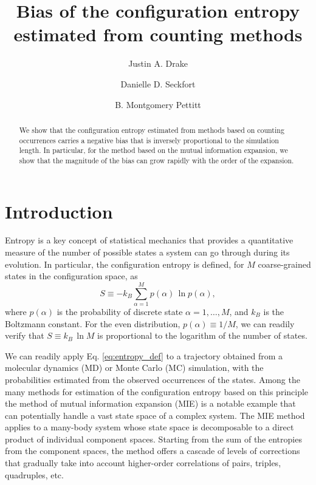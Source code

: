 \documentclass[preprint, superscriptaddress]{revtex4-1}
\begin{document}
\title{Bias of the configuration entropy estimated from counting methods}

\author{Justin A. Drake}
\author{Danielle D. Seckfort}
\author{B. Montgomery Pettitt}

\begin{abstract}
We show that the configuration entropy estimated from methods based on counting occurrences
carries a negative bias
that is inversely proportional to the simulation length.
%
In particular, for the method based on the mutual information expansion,
we show that the magnitude of the bias can grow rapidly with the order of the expansion.
\end{abstract}

\maketitle


\section{Introduction}

Entropy is a key concept of statistical mechanics that provides a quantitative measure of
the number of possible states a system can go through during its evolution.
%
In particular, the configuration entropy is defined,
for $M$ coarse-grained states in the configuration space, as
%
\begin{equation}
  S
  \equiv
  -k_B \sum_{\alpha = 1}^M p(\alpha) \, \ln p(\alpha)
  ,
  \label{eq:entropy_def}
\end{equation}
%
where $p(\alpha)$ is the probability of discrete state $\alpha = 1, \dots, M$,
and $k_B$ is the Boltzmann constant.
%
For the even distribution, $p(\alpha) \equiv 1/M$,
we can readily verify that $S \equiv k_B \, \ln M$
is proportional to the logarithm of the number of states.

We can readily apply Eq. \eqref{eq:entropy_def} to a trajectory
obtained from a molecular dynamics (MD) or Monte Carlo (MC) simulation,
with the probabilities estimated from the observed occurrences of the states.
%
Among the many methods for estimation of the configuration entropy based on this principle
the method of mutual information expansion (MIE) is a notable example
that can potentially handle a vast state space of a complex system.
%
The MIE method applies to a many-body system
 whose state space is decomposable to a direct product of individual component spaces.
%
Starting from the sum of the entropies from the component spaces,
the method offers a cascade of levels of corrections
that gradually take into account higher-order correlations
of pairs, triples, quadruples, etc.
\end{document}
